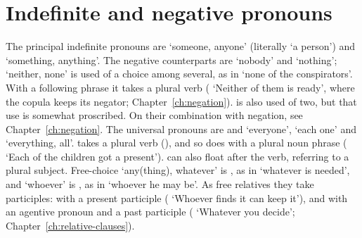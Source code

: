 \section{Indefinite and negative pronouns}\label{sec:indefinite-pronouns}
The principal indefinite pronouns are  `someone, anyone' (literally `a person') and  `something, anything'.
The negative counterparts are  `nobody' and  `nothing';  `neither, none' is used of a choice among several, as in  `none of the conspirators'. With a following  phrase it takes a plural verb ( `Neither of them is ready', where the copula keeps its negator; Chapter~\ref{ch:negation}).  is also used of two, but that use is somewhat proscribed. On their combination with negation, see Chapter~\ref{ch:negation}.
The universal pronouns are  and  `everyone',  `each one' and  `everything, all'.  takes a plural verb (), and so does  with a plural noun phrase ( `Each of the children got a present').  can also float after the verb, referring to a plural subject.
Free-choice `any(thing), whatever' is , as in  `whatever is needed', and `whoever' is , as in  `whoever he may be'. As free relatives they take participles:  with a present participle ( `Whoever finds it can keep it'), and  with an agentive pronoun and a past participle ( `Whatever you decide'; Chapter~\ref{ch:relative-clauses}).

